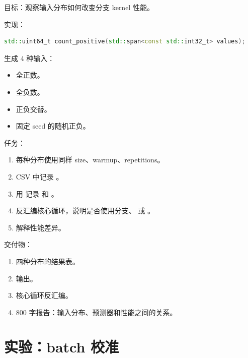 \begin{labbox}
目标：观察输入分布如何改变分支 kernel 性能。

实现：

\begin{lstlisting}[language=C++]
std::uint64_t count_positive(std::span<const std::int32_t> values);
\end{lstlisting}

生成 4 种输入：

\begin{itemize}
  \item 全正数。
  \item 全负数。
  \item 正负交替。
  \item 固定 seed 的随机正负。
\end{itemize}

任务：

\begin{enumerate}
  \item 每种分布使用同样 size、warmup、repetitions。
  \item CSV 中记录 。
  \item 用  记录  和 。
  \item 反汇编核心循环，说明是否使用分支、 或 。
  \item 解释性能差异。
\end{enumerate}

交付物：

\begin{enumerate}
  \item 四种分布的结果表。
  \item {} 输出。
  \item 核心循环反汇编。
  \item 800 字报告：输入分布、预测器和性能之间的关系。
\end{enumerate}
\end{labbox}

\section{实验：batch 校准}

